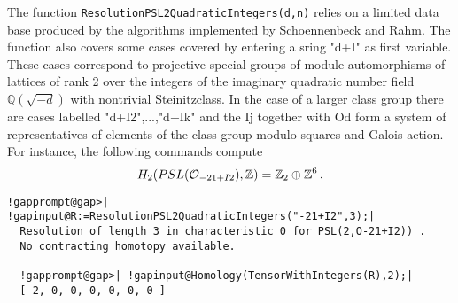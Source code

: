 \documentclass[a4paper,11pt]{report}
\begin{document}
{{\begin{Verbatim}[commandchars=@|A,fontsize=\small,frame=single,label=Example]
\end{Verbatim}
 

The function \texttt{ResolutionPSL2QuadraticIntegers(\texttt{}d,n)} relies on a limited data base produced by the algorithms implemented by
Schoennenbeck and Rahm. The function also covers some cases covered by
entering a sring "\texttt{}d+I" as first variable. These cases
correspond to projective special groups of module automorphisms of lattices of
rank 2 over the integers of the imaginary quadratic number field $\mathbb Q(\sqrt{-d})$ with non\texttt{}trivial Steinitz\texttt{}class. In the
case of a larger class group there are cases labelled
"\texttt{}d+I2",...,"\texttt{}d+Ik" and the Ij together
with O\texttt{}d form a system of representatives of elements of
the class group modulo squares and Galois action. For instance, the following
commands compute 
\[H_2(PSL({\cal O}_{-21+I2}),\mathbb Z) = \mathbb Z_2\oplus \mathbb Z^6\, .\]
 
\begin{Verbatim}[commandchars=!@|,fontsize=\small,frame=single,label=Example]
  !gapprompt@gap>| !gapinput@R:=ResolutionPSL2QuadraticIntegers("-21+I2",3);|
  Resolution of length 3 in characteristic 0 for PSL(2,O-21+I2)) . 
  No contracting homotopy available. 
  
  !gapprompt@gap>| !gapinput@Homology(TensorWithIntegers(R),2);|
  [ 2, 0, 0, 0, 0, 0, 0 ]
  
\end{Verbatim}
 }

 
}
\end{document}
